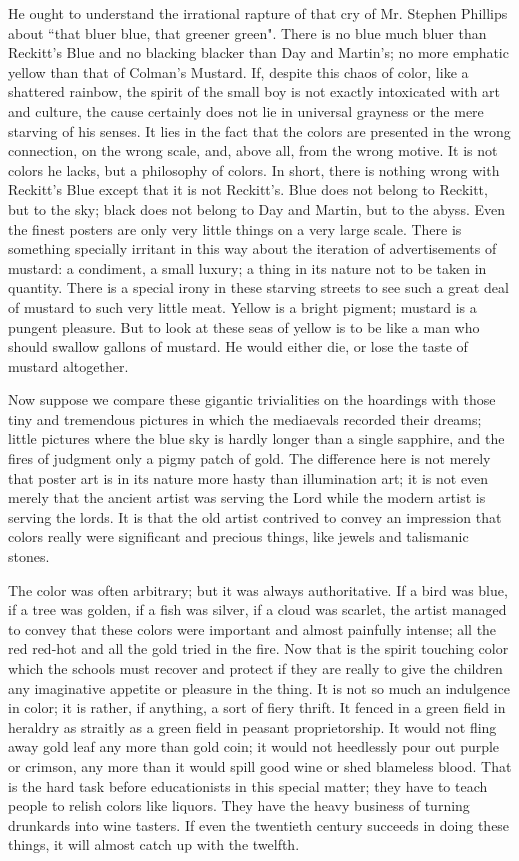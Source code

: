 \documentclass[final,10pt,letterpaper,twocolumn,openany]{book}
\begin{document}
He ought to understand the irrational rapture of that
cry of Mr. Stephen Phillips about ``that bluer blue, that greener green".
There is no blue much bluer than Reckitt's Blue and no blacking blacker
than Day and Martin's; no more emphatic yellow than that of Colman's
Mustard. If, despite this chaos of color, like a shattered rainbow, the spirit
of the small boy is not exactly intoxicated with art and culture, the cause
certainly does not lie in universal grayness or the mere starving of his
senses. It lies in the fact that the colors are presented in the wrong
connection, on the wrong scale, and, above all, from the wrong motive. It
is not colors he lacks, but a philosophy of colors. In short, there is nothing
wrong with Reckitt's Blue except that it is not Reckitt's. Blue does not
belong to Reckitt, but to the sky; black does not belong to Day and Martin,
but to the abyss. Even the finest posters are only very little things on a
very large scale. There is something specially irritant in this way about the
iteration of advertisements of mustard: a condiment, a small luxury; a
thing in its nature not to be taken in quantity. There is a special irony in
these starving streets to see such a great deal of mustard to such very little
meat. Yellow is a bright pigment; mustard is a pungent pleasure. But to
look at these seas of yellow is to be like a man who should swallow
gallons of mustard. He would either die, or lose the taste of mustard
altogether.

Now suppose we compare these gigantic trivialities on the hoardings
with those tiny and tremendous pictures in which the mediaevals recorded
their dreams; little pictures where the blue sky is hardly longer than a
single sapphire, and the fires of judgment only a pigmy patch of gold. The
difference here is not merely that poster art is in its nature more hasty than
illumination art; it is not even merely that the ancient artist was serving the
Lord while the modern artist is serving the lords. It is that the old artist
contrived to convey an impression that colors really were significant and
precious things, like jewels and talismanic stones. 

The color was often
arbitrary; but it was always authoritative. If a bird was blue, if a tree was
golden, if a fish was silver, if a cloud was scarlet, the artist managed to
convey that these colors were important and almost painfully intense; all
the red red-hot and all the gold tried in the fire. Now that is the spirit
touching color which the schools must recover and protect if they are
really to give the children any imaginative appetite or pleasure in the thing.
It is not so much an indulgence in color; it is rather, if anything, a sort of
fiery thrift. It fenced in a green field in heraldry as straitly as a green field
in peasant proprietorship. It would not fling away gold leaf any more than
gold coin; it would not heedlessly pour out purple or crimson, any more
than it would spill good wine or shed blameless blood. That is the hard
task before educationists in this special matter; they have to teach people
to relish colors like liquors. They have the heavy business of turning
drunkards into wine tasters. If even the twentieth century succeeds in
doing these things, it will almost catch up with the twelfth.
\end{document}
